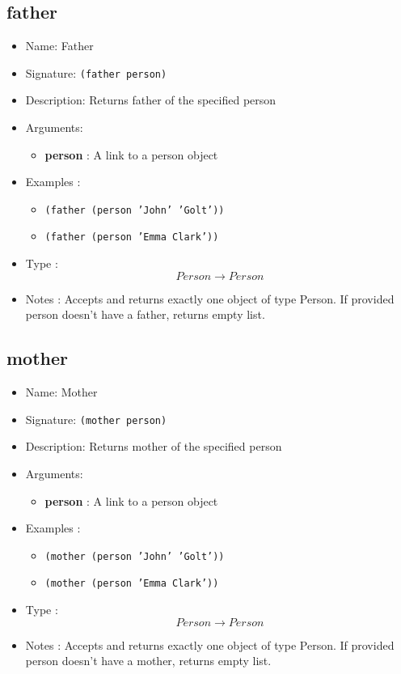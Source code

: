 \subsection{father}
\begin{itemize}
    \item Name: Father
    \item Signature: \texttt{(father person)}
    \item Description: Returns father of the specified person
    \item Arguments:
        \begin{itemize}
            \item \textbf{person} : A link to a person object
        \end{itemize}
    \item Examples :
        \begin{itemize}
            \item \texttt{(father (person 'John' 'Golt'))}
            \item \texttt{(father (person 'Emma Clark'))}
        \end{itemize}
    \item Type : \[Person \to Person\]
    \item Notes : Accepts and returns exactly one object of type Person. If provided person doesn't have a father, returns empty
        list.
\end{itemize}

\subsection{mother}
\begin{itemize}
    \item Name: Mother
    \item Signature: \texttt{(mother person)}
    \item Description: Returns mother of the specified person
    \item Arguments:
        \begin{itemize}
            \item \textbf{person} : A link to a person object
        \end{itemize}
    \item Examples :
        \begin{itemize}
            \item \texttt{(mother (person 'John' 'Golt'))}
            \item \texttt{(mother (person 'Emma Clark'))}
        \end{itemize}
    \item Type : \[Person \to Person\]
    \item Notes : Accepts and returns exactly one object of type Person. If provided person doesn't have a mother, returns empty
        list.
\end{itemize}

